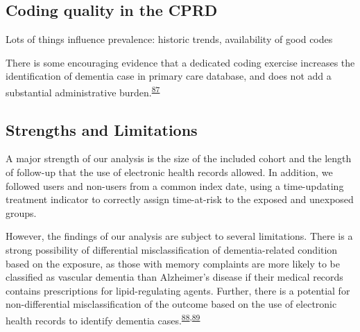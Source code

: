 \documentclass[a4paper, twoside]{templates/ociamthesis}
\begin{document}
\hypertarget{coding-quality-in-the-cprd}{%
\subsection{Coding quality in the CPRD}\label{coding-quality-in-the-cprd}}

Lots of things influence prevalence: historic trends, availability of good codes

There is some encouraging evidence that a dedicated coding exercise increases the identification of dementia case in primary care database, and does not add a substantial administrative burden.\textsuperscript{\protect\hyperlink{ref-russell2013}{87}}

\hypertarget{strengths-and-limitations}{%
\subsection{Strengths and Limitations}\label{strengths-and-limitations}}

A major strength of our analysis is the size of the included cohort and the length of follow-up that the use of electronic health records allowed. In addition, we followed users and non-users from a common index date, using a time-updating treatment indicator to correctly assign time-at-risk to the exposed and unexposed groups.

However, the findings of our analysis are subject to several limitations. There is a strong possibility of differential misclassification of dementia-related condition based on the exposure, as those with memory complaints are more likely to be classified as vascular dementia than Alzheimer's disease if their medical records contains prescriptions for lipid-regulating agents. Further, there is a potential for non-differential misclassification of the outcome based on the use of electronic health records to identify dementia cases.\textsuperscript{\protect\hyperlink{ref-wilkinson2018}{88},\protect\hyperlink{ref-mcguinness2019b}{89}}
\end{document}
